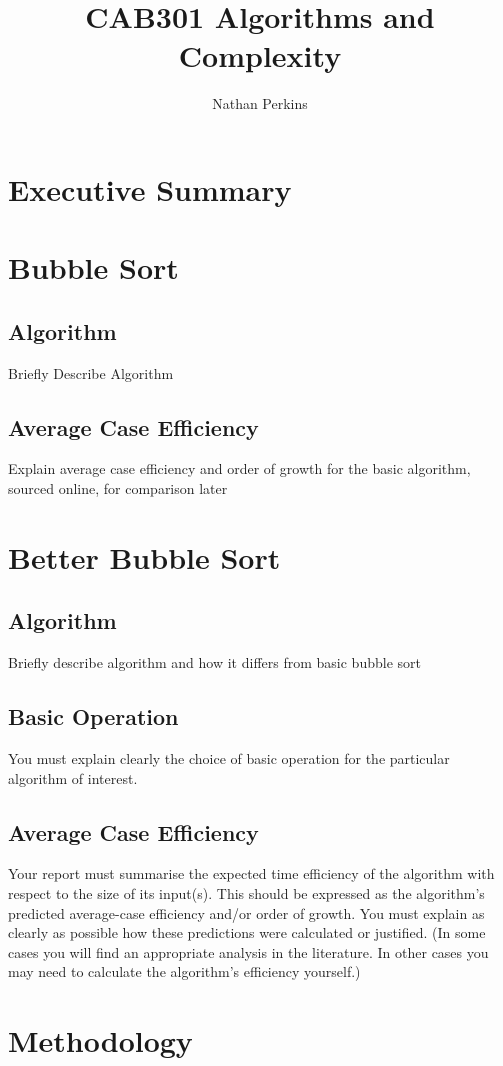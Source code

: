 \documentclass[]{article}
\title{CAB301 Algorithms and Complexity}
\author{Nathan Perkins}
\begin{document}
\maketitle
\tableofcontents
\newpage
\section{Executive Summary}
\section{Bubble Sort}
\subsection{Algorithm}
Briefly Describe Algorithm
\subsection{Average Case Efficiency}
Explain average case efficiency and order of growth for the basic algorithm, sourced online, for comparison later
\section{Better Bubble Sort}
\subsection{Algorithm}
Briefly describe algorithm and how it differs from basic bubble sort
\subsection{Basic Operation}
You must explain clearly the choice of basic operation for the particular algorithm of interest.
\subsection{Average Case Efficiency}
Your report must summarise the expected time efficiency of the algorithm with respect to the
size of its input(s). This should be expressed as the algorithm’s predicted average-case
efficiency and/or order of growth. You must explain as clearly as possible how these
predictions were calculated or justified. (In some cases you will find an appropriate analysis
in the literature. In other cases you may need to calculate the algorithm’s efficiency yourself.)
\section{Methodology}
\end{document}
